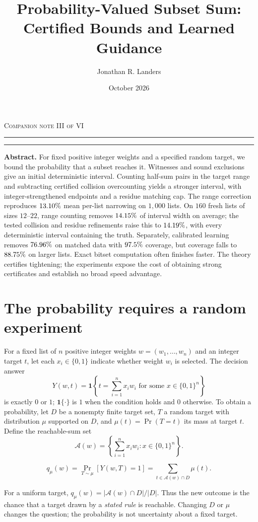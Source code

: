 \documentclass[10pt,english]{article}
\title{\sffamily\bfseries Probability-Valued Subset Sum:\\ Certified Bounds and Learned Guidance}
\author{Jonathan R. Landers}
\date{October 2026}
\begin{document}
\maketitle
\vspace{-1em}
\noindent\textcolor{paperaccent}{\footnotesize\textsc{Companion note III of VI}}
\par\noindent\textcolor{paperaccent}{\rule{.11\linewidth}{1.5pt}}\textcolor{paperline}{\rule{.89\linewidth}{.45pt}}
\vspace{.65em}

\begin{tcolorbox}[accentbox]
\textbf{Abstract.} For fixed positive integer weights and a specified random target, we bound the probability that a subset reaches it. Witnesses and sound exclusions give an initial deterministic interval. Counting half-sum pairs in the target range and subtracting certified collision overcounting yields a stronger interval, with integer-strengthened endpoints and a residue matching cap. The range correction reproduces \(13.10\%\) mean per-list narrowing on \(1{,}000\) lists. On \(160\) fresh lists of sizes \(12\)--\(22\), range counting removes \(14.15\%\) of interval width on average; the tested collision and residue refinements raise this to \(14.19\%\), with every deterministic interval containing the truth. Separately, calibrated learning removes \(76.96\%\) on matched data with \(97.5\%\) coverage, but coverage falls to \(88.75\%\) on larger lists. Exact bitset computation often finishes faster. The theory certifies tightening; the experiments expose the cost of obtaining strong certificates and establish no broad speed advantage.
\end{tcolorbox}

\section{The probability requires a random experiment}
For a fixed list of \(n\) positive integer weights \(w=(w_1,\ldots,w_n)\) and
an integer target \(t\), let each \(x_i\in\{0,1\}\) indicate whether
weight \(w_i\) is selected. The decision answer
\[
Y(w,t)=\mathbf{1}\!\left\{t=\sum_{i=1}^n x_iw_i
  \text{ for some }x\in\{0,1\}^n\right\}
\]
is exactly \(0\) or \(1\); \(\mathbf{1}\{\cdot\}\) is \(1\) when the
condition holds and \(0\) otherwise. To obtain a probability, let \(D\)
be a nonempty finite target set, \(T\) a random target with distribution
\(\mu\) supported on \(D\), and \(\mu(t)=\Pr(T=t)\) its mass at target
\(t\). Define the reachable-sum set
\[
\mathcal A(w)=\left\{\sum_{i=1}^n x_iw_i:x\in\{0,1\}^n\right\}.
\]
\begin{tcolorbox}[accentbox]
\[
q_\mu(w)=\Pr_{T\sim\mu}[Y(w,T)=1]
        =\sum_{t\in\mathcal A(w)\cap D}\mu(t).
\]
\end{tcolorbox}
For a uniform target, \(q_\mu(w)=|\mathcal A(w)\cap D|/|D|\). Thus the new outcome is the chance that a target drawn by a \emph{stated rule} is reachable. Changing \(D\) or \(\mu\) changes the question; the probability is not uncertainty about a fixed target.
\end{document}

